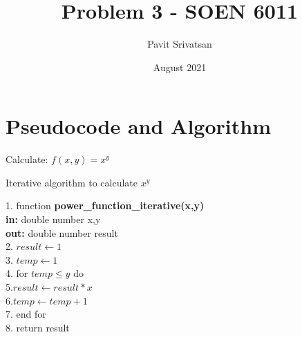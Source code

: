 \documentclass{article}
\title{Problem 3 - SOEN 6011}
\author{Pavit Srivatsan}
\date{August 2021}
\begin{document}
\maketitle
\section*{Pseudocode and Algorithm}
Calculate: $f(x,y) = x^y$

\begin{algorithm}
\caption{Iterative algorithm to calculate $x^y$}
\begin{algorithmic} 
1. function \textbf{power\_function\_iterative(x,y)}\\
\textbf{in: } double number x,y\\
\textbf{out: } double number result\\
2. \STATE $result \leftarrow 1$\\
3. \STATE $temp \leftarrow 1$\\
4. for {$temp \leq y$} do\\
5.\qquad \STATE $result \leftarrow result*x$\\
6.\qquad\STATE $temp \leftarrow temp+1$\\
7. end for \\
8. \STATE return result\\
\end{algorithmic}
\end{algorithm}
\end{document}
